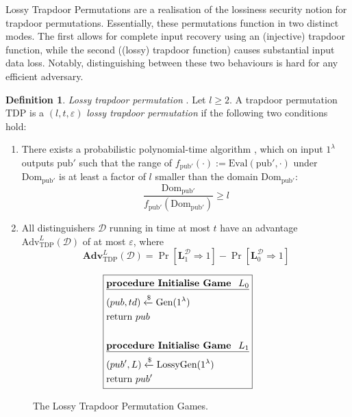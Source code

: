 \documentclass[]{final_report}
\theoremstyle{definition}
\newtheorem{definition}{Definition}[chapter]
\begin{document}
Lossy Trapdoor Permutations are a realisation of the lossiness security notion for trapdoor permutations. Essentially, these permutations function in two distinct modes. The first allows for complete input recovery using an (injective) trapdoor function, while the second ((lossy) trapdoor function) causes substantial input data loss. Notably, distinguishing between these two behaviours is hard for any efficient adversary.

\begin{definition}
\textit{Lossy trapdoor permutation} \cite{10.1145/1374376.1374406, kakvi2018optimal}. Let \( l \geq 2 \). A trapdoor permutation \( \text{TDP} \) is a \( (l, t, \varepsilon) \) \textit{lossy trapdoor permutation} if the following two conditions hold:

\begin{enumerate}
    \item There exists a probabilistic polynomial-time algorithm , which on input \( 1^\lambda \) outputs \( \text{pub}' \) such that the range of \( f_{\text{pub}'}(\cdot) := \text{Eval}(\text{pub}', \cdot) \) under \( \text{Dom}_{\text{pub}'} \) is at least a factor of \( l \) smaller than the domain \( \text{Dom}_{\text{pub}'} \): 
    \[ \frac{\text{Dom}_{\text{pub}'}}{f_{\text{pub}'}(\text{Dom}_{\text{pub}'})} \geq l \]
    
    \item All distinguishers \( \mathcal{D} \) running in time at most \( t \) have an advantage \( \text{Adv}^L_{\text{TDP}}(\mathcal{D}) \) of at most \( \varepsilon \), where
    \[ \textbf{Adv}^L_{\text{TDP}}(\mathcal{D}) = \Pr[\textbf{L}_{1}^{\mathcal{D}}  \Rightarrow 1] - \Pr[\textbf{L}_{0}^{\mathcal{D}} \Rightarrow 1] \]
\end{enumerate}
\end{definition}

\begin{figure}[H]
\[
\boxed{
\begin{aligned}
&\underline{\textbf{\text{procedure Initialise Game } \(L_0\)}} \\
&(pub, td) \xleftarrow{\$} \text{Gen}(1^\lambda) \\
&\text{return } pub \\
\\
&\underline{\textbf{\text{procedure Initialise Game } \(L_1\)}} \\
&(pub', L) \xleftarrow{\$} \text{LossyGen}(1^\lambda) \\
&\text{return } pub' \\
\end{aligned}
}
\]
\caption{The Lossy Trapdoor Permutation Games.}
\label{fig:lossy_trapdoor_permutation_games}
\end{figure}
\end{document}
